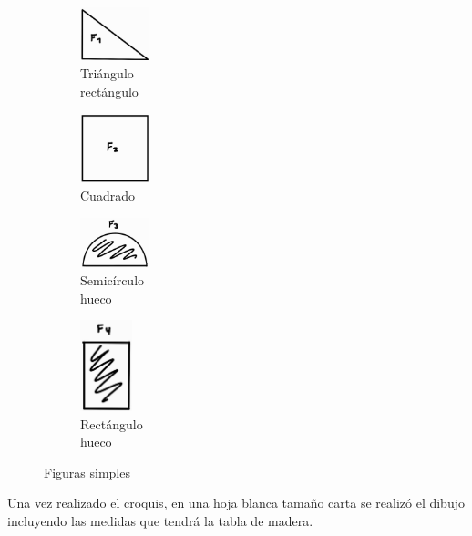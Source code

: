 \documentclass[12pt, titlepage]{report}
\begin{document}
    \begin{figure}[ht]
        \centering
        \begin{subfigure}{0.25\textwidth}
            \centering
            \includegraphics[width=2cm]{Croquis_Fig1.jpg}
            \caption{Triángulo\\rectángulo}
        \end{subfigure}  
        \begin{subfigure}{0.25\textwidth}
            \centering
            \includegraphics[width=2cm]{Croquis_Fig2.jpg}
            \caption{Cuadrado}
        \end{subfigure} 
        \begin{subfigure}{0.25\textwidth}
            \centering
            \includegraphics[width=2cm]{Croquis_Fig3.jpg}
            \caption{Semicírculo\\hueco}
        \end{subfigure} 
        \begin{subfigure}{0.25\textwidth}
            \centering
            \includegraphics[width=1.5cm]{Croquis_Fig4.jpg}
            \caption{Rectángulo\\hueco}
        \end{subfigure}  
        \caption{Figuras simples}     
    \end{figure}

    Una vez realizado el croquis, en una hoja blanca tamaño carta se realizó el dibujo incluyendo las medidas que tendrá la tabla de madera.
\end{document}
